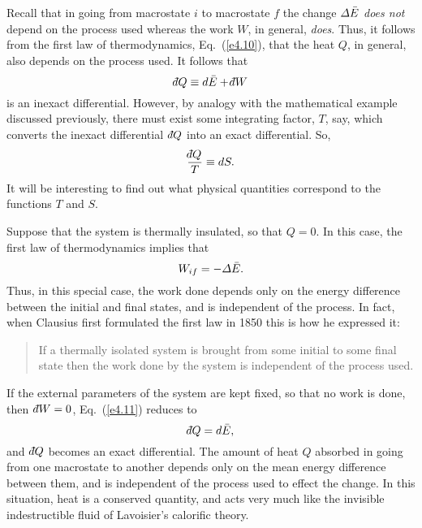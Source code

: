 Recall that in going from macrostate $i$ to macrostate $f$ the change ${\mit\Delta} \bar{E}$ 
{\em does not}
depend on the process used whereas the work $W$, in general, {\em does}. 
Thus, it follows from
the first law of thermodynamics, Eq.~(\ref{e4.10}),
 that the heat $Q$, in general, also depends on the 
process used. It follows that
\begin{equation}
\dbar Q \equiv  d \bar{E} + \dbar W
\end{equation}
is an inexact differential. However, by analogy with the mathematical example
discussed previously, there must exist some integrating factor, $T$, say, which
converts the inexact differential $\,\dbar Q$ into an exact differential. 
So,
\begin{equation}
\frac{\dbar Q}{T} \equiv dS.
\end{equation}
It will be interesting to find out what physical quantities correspond to 
 the functions $T$ and $S$. 

Suppose that the system is thermally insulated, so that $Q=0$. In this case, the
first law of thermodynamics implies that
\begin{equation}
W_{if} = - {\mit\Delta} \bar{E}.
\end{equation}
Thus, in this special case, the work done depends only on the energy 
difference between the initial and final states, and is independent of the process.
In fact, when Clausius first formulated the first law in 1850
this is how he expressed it:
\begin{quote}
{\sf If a thermally isolated system is brought from some initial to some final state
then the work done by the system is independent of the process used.}
\end{quote}

If the external parameters of the system are kept fixed, so that no work is done,
then $\,\dbar W=0$,  Eq.~(\ref{e4.11}) reduces
to
\begin{equation}
\dbar Q = d \bar{E},
\end{equation}
and $\,\dbar Q$ becomes an exact differential. The amount of heat $Q$ absorbed
in going from one macrostate to another 
depends only on the mean energy difference between them, and
 is independent of the process used to effect the change.  In this situation,
heat is a conserved quantity, and acts very much like the invisible indestructible
fluid of Lavoisier's calorific theory.

